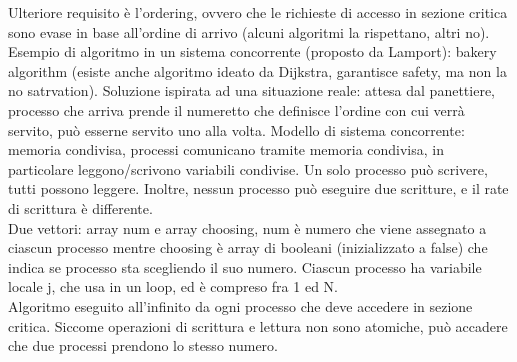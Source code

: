 \documentclass[16px]{article}
\begin{document}
Ulteriore requisito è l'ordering, ovvero che le richieste di accesso in sezione critica sono evase in base all'ordine di arrivo (alcuni algoritmi la rispettano, altri no).\\ Esempio di algoritmo in un sistema concorrente (proposto da Lamport): bakery algorithm (esiste anche algoritmo ideato da Dijkstra, garantisce safety, ma non la no satrvation). Soluzione ispirata ad una situazione reale: attesa dal panettiere, processo che arriva prende il numeretto che definisce l'ordine con cui verrà servito, può esserne servito uno alla volta. Modello di sistema concorrente: memoria condivisa, processi comunicano tramite memoria condivisa, in particolare leggono/scrivono variabili condivise. Un solo processo può scrivere, tutti possono leggere. Inoltre, nessun processo può eseguire due scritture, e il rate di scrittura è differente.\\ Due vettori: array num e array choosing, num è numero che viene assegnato a ciascun processo mentre choosing è array di booleani (inizializzato a false) che indica se processo sta scegliendo il suo numero. Ciascun processo ha variabile locale j, che usa in un loop, ed è compreso fra 1 ed N.\\ Algoritmo eseguito all'infinito da ogni processo che deve accedere in sezione critica. Siccome operazioni di scrittura e lettura non sono atomiche, può accadere che due processi prendono lo stesso numero.
\end{document}
